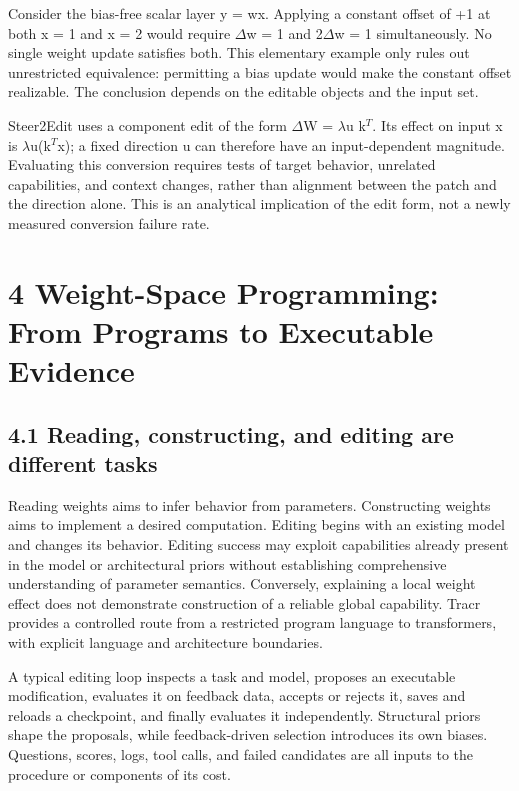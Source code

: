 Consider the bias-free scalar layer y = wx. Applying a constant offset of +1 at both x = 1 and x = 2 would require \ensuremath{\Delta}w = 1 and 2\ensuremath{\Delta}w = 1 simultaneously. No single weight update satisfies both. This elementary example only rules out unrestricted equivalence: permitting a bias update would make the constant offset realizable. The conclusion depends on the editable objects and the input set.


Steer2Edit uses a component edit of the form \ensuremath{\Delta}W = \ensuremath{\lambda}u k\ensuremath{{}^T}.\cite{r120} Its effect on input x is \ensuremath{\lambda}u(k\ensuremath{{}^T}x); a fixed direction u can therefore have an input-dependent magnitude. Evaluating this conversion requires tests of target behavior, unrelated capabilities, and context changes, rather than alignment between the patch and the direction alone. This is an analytical implication of the edit form, not a newly measured conversion failure rate.


\section*{4 Weight-Space Programming: From Programs to Executable Evidence}

\subsection*{4.1 Reading, constructing, and editing are different tasks}

Reading weights aims to infer behavior from parameters. Constructing weights aims to implement a desired computation. Editing begins with an existing model and changes its behavior. Editing success may exploit capabilities already present in the model or architectural priors without establishing comprehensive understanding of parameter semantics. Conversely, explaining a local weight effect does not demonstrate construction of a reliable global capability.\cite{r1,r49,r50} Tracr provides a controlled route from a restricted program language to transformers, with explicit language and architecture boundaries.\cite{r11}


A typical editing loop inspects a task and model, proposes an executable modification, evaluates it on feedback data, accepts or rejects it, saves and reloads a checkpoint, and finally evaluates it independently. Structural priors shape the proposals, while feedback-driven selection introduces its own biases. Questions, scores, logs, tool calls, and failed candidates are all inputs to the procedure or components of its cost.\cite{r1,r48}


